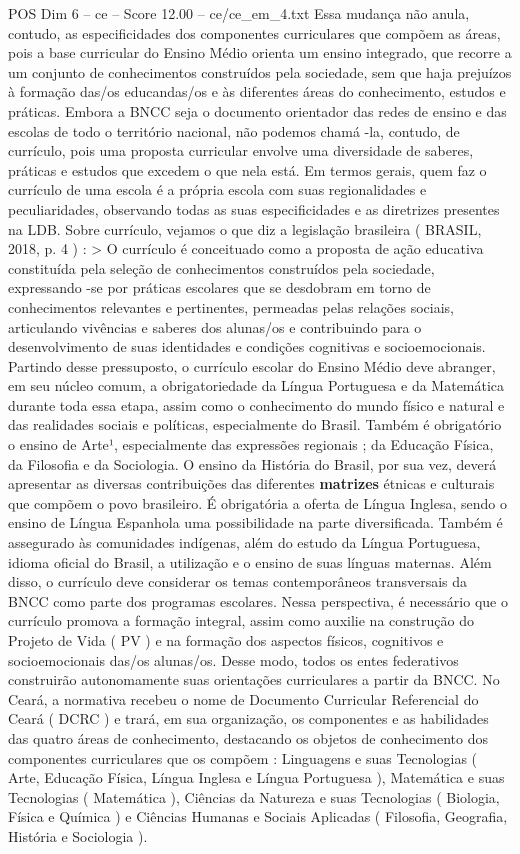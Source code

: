\begin{textsample}{POS Dim 6 – ce – Score 12.00 – ce/ce\_em\_4.txt}
Essa mudança não anula, contudo, as especificidades dos componentes curriculares que compõem as áreas, pois a base curricular do Ensino Médio orienta um ensino integrado, que recorre a um conjunto de conhecimentos construídos pela sociedade, sem que haja prejuízos à formação das/os educandas/os e às diferentes áreas do conhecimento, estudos e práticas.
Embora a BNCC seja o documento orientador das redes de ensino e das escolas de todo o território nacional, não podemos chamá -la, contudo, de currículo, pois uma proposta curricular envolve uma diversidade de saberes, práticas e estudos que excedem o que nela está.
Em termos gerais, quem faz o currículo de uma escola é a própria escola com suas regionalidades e peculiaridades, observando todas as suas especificidades e as diretrizes presentes na LDB.
Sobre currículo, vejamos o que diz a legislação brasileira ( BRASIL, 2018, p. 4 ) : > O currículo é conceituado como a proposta de ação educativa constituída pela seleção de conhecimentos construídos pela sociedade, expressando -se por práticas escolares que se desdobram em torno de conhecimentos relevantes e pertinentes, permeadas pelas relações sociais, articulando vivências e saberes dos alunas/os e contribuindo para o desenvolvimento de suas identidades e condições cognitivas e socioemocionais.
Partindo desse pressuposto, o currículo escolar do Ensino Médio deve abranger, em seu núcleo comum, a obrigatoriedade da Língua Portuguesa e da Matemática durante toda essa etapa, assim como o conhecimento do mundo físico e natural e das realidades sociais e políticas, especialmente do Brasil.
Também é obrigatório o ensino de Arte¹, especialmente das expressões regionais ; da Educação Física, da Filosofia e da Sociologia.
O ensino da História do Brasil, por sua vez, deverá apresentar as diversas contribuições das diferentes \textbf{matrizes} étnicas e culturais que compõem o povo brasileiro.
É obrigatória a oferta de Língua Inglesa, sendo o ensino de Língua Espanhola uma possibilidade na parte diversificada.
Também é assegurado às comunidades indígenas, além do estudo da Língua Portuguesa, idioma oficial do Brasil, a utilização e o ensino de suas línguas maternas.
Além disso, o currículo deve considerar os temas contemporâneos transversais da BNCC como parte dos programas escolares.
Nessa perspectiva, é necessário que o currículo promova a formação integral, assim como auxilie na construção do Projeto de Vida ( PV ) e na formação dos aspectos físicos, cognitivos e socioemocionais das/os alunas/os.
Desse modo, todos os entes federativos construirão autonomamente suas orientações curriculares a partir da BNCC.
No Ceará, a normativa recebeu o nome de Documento Curricular Referencial do Ceará ( DCRC ) e trará, em sua organização, os componentes e as habilidades das quatro áreas de conhecimento, destacando os objetos de conhecimento dos componentes curriculares que os compõem : Linguagens e suas Tecnologias ( Arte, Educação Física, Língua Inglesa e Língua Portuguesa ), Matemática e suas Tecnologias ( Matemática ), Ciências da Natureza e suas Tecnologias ( Biologia, Física e Química ) e Ciências Humanas e Sociais Aplicadas ( Filosofia, Geografia, História e Sociologia ).


\end{textsample}
